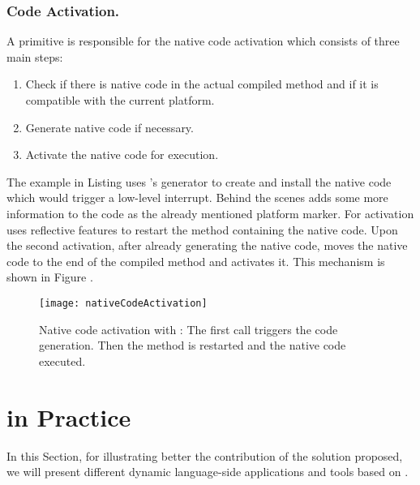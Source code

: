\subsubsection{Code Activation.}
 
A \B primitive is responsible for the native code activation which consists of three main steps:
%
\begin{enumerate}
	\item Check if there is native code in the actual compiled method and if it is compatible with the current platform.
	\item Generate native code if necessary.
	\item Activate the native code for execution.
\end{enumerate}
%
The example in Listing  uses \B's generator to create and install the native code which would trigger a low-level interrupt. Behind the scenes \B adds some more information to the code as the already mentioned platform marker. 
For activation \B uses reflective features to restart the method containing the native code.
Upon the second activation, after already generating the native code, \B moves the native code to the end of the compiled method and activates it.
This mechanism is shown in Figure .

\begin{figure}[ht]
	\centering
	\texttt{[image: nativeCodeActivation]}
	\caption{Native code activation with \B: The first call triggers the code generation. Then the method is restarted and the native code executed.}
\end{figure}

\section{\B in Practice}

In this Section, for illustrating better the contribution of the solution proposed, we will present different dynamic language-side applications and tools based on \B.

